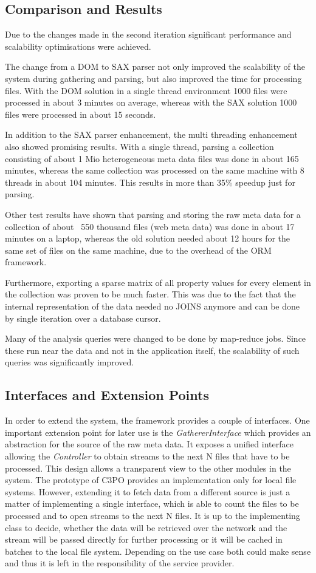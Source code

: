\subsection{Comparison and Results}
Due to the changes made in the second iteration significant performance and scalability optimisations were achieved.

The change from a DOM to SAX parser not only improved the scalability of the system during gathering and parsing, but also improved the time for processing files. With the DOM solution in a single thread environment 1000 files were processed in about 3 minutes on average, whereas with the SAX solution 1000 files were processed in about 15 seconds.

In addition to the SAX parser enhancement, the multi threading enhancement also showed promising results. With a single thread, parsing a collection consisting of about 1 Mio heterogeneous meta data files was done in about 165 minutes, whereas the same collection was processed on the same machine with 8 threads in about 104 minutes. This results in more than 35\% speedup just for parsing.

Other test results have shown that parsing and storing the raw meta data for a collection of about ~550 thousand files (web meta data) was done in about 17 minutes on a laptop, whereas the old solution needed about 12 hours for the same set of files on the same machine, due to the overhead of the ORM framework.

Furthermore, exporting a sparse matrix of all property values for every element in the collection was proven to be much faster. This was due to the fact that the internal representation of the data needed no JOINS anymore and can be done by single iteration over a database cursor.

Many of the analysis queries were changed to be done by map-reduce jobs. Since these run near the data and not in the application itself, the scalability of such queries was significantly improved.

\subsection{Interfaces and Extension Points}
In order to extend the system, the framework provides a couple of interfaces. One important extension point for later use is the \textit{GathererInterface} which provides an abstraction for the source of the raw meta data. It exposes a unified interface allowing the \textit{Controller} to obtain streams to the next N files that have to be processed. This design allows a transparent view to the other modules in the system. The prototype of C3PO provides an implementation only for local file systems. However, extending it to fetch data from a different source is just a matter of implementing a single interface, which is able to count the files to be processed and to open streams to the next N files. It is up to the implementing class to decide, whether the data will be retrieved over the network and the stream will be passed directly for further processing or it will be cached in batches to the local file system. Depending on the use case both could make sense and thus it is left in the responsibility of the service provider.

